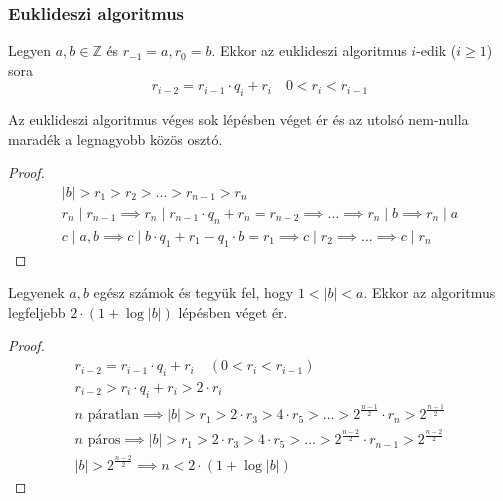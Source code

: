\subsubsection{Euklideszi algoritmus}
\begin{definition}
	Legyen $a, b \in \mathbb{Z}$ és $r_{-1} = a, r_0 = b$.
	Ekkor az euklideszi algoritmus $i$-edik ($i \geq 1$) sora
	\begin{equation*}
		r_{i - 2} = r_{i - 1} \cdot q_i + r_i \quad 0 < r_i < r_{i - 1}
	\end{equation*}
\end{definition}
\begin{theorem}
	Az euklideszi algoritmus véges sok lépésben véget ér és
	az utolsó nem-nulla maradék a legnagyobb közös osztó.
\end{theorem}
\begin{proof}
	\begin{gather*}
		|b| > r_1 > r_2 > \dots > r_{n - 1} > r_n \\
		r_n \mid r_{n - 1} \implies
		r_n \mid r_{n - 1} \cdot q_n + r_n = r_{n - 2} \implies
		\dots \implies r_n \mid b \implies r_n \mid a \\
		c \mid a, b \implies
		c \mid b \cdot q_1 + r_1 - q_1 \cdot b = r_1 \implies
		c \mid r_2 \implies \dots \implies c \mid r_n
	\end{gather*}
\end{proof}
\begin{theorem}
	Legyenek $a, b$ egész számok és tegyük fel, hogy $1 < |b| < a$.
	Ekkor az algoritmus legfeljebb $2 \cdot (1 + \log |b|)$ lépésben véget ér.
\end{theorem}
\begin{proof}
	\begin{gather*}
		r_{i - 2} = r_{i - 1} \cdot q_i + r_i \quad (0 < r_i < r_{i - 1}) \\
		r_{i - 2} > r_i \cdot q_i + r_i > 2 \cdot r_i \\
		n \text{ páratlan} \implies |b| > r_1 > 2 \cdot r_3 > 4 \cdot r_5 >
		\dots > 2^\frac{n - 1}{2} \cdot r_n > 2^\frac{n - 1}{2} \\
		n \text{ páros} \implies |b| > r_1 > 2 \cdot r_3 > 4 \cdot r_5 >
		\dots > 2^\frac{n - 2}{2} \cdot r_{n - 1} > 2^\frac{n - 2}{2} \\
		|b| > 2^\frac{n - 2}{2} \implies n < 2 \cdot (1 + \log |b|)
	\end{gather*}
\end{proof}
